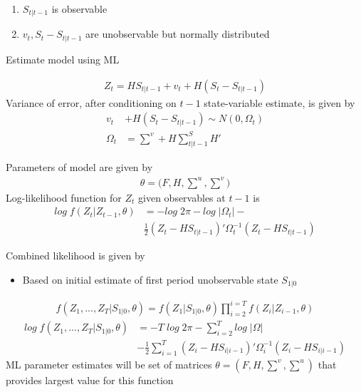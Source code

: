 \documentclass{beamer}
\begin{document}
\begin{frame}
  \begin{enumerate}
     \item $S_{t|t-1}$ is observable
     \item $v_t, S_t-S_{t|t-1}$ are unobservable but normally distributed
   \end{enumerate} 
   \medskip
   Estimate model using ML
  
  \begin{align}
    Z_t=HS_{t|t-1}+v_t +H(S_t-S_{t|t-1})
  \end{align}
  \medskip
  Variance of error, after conditioning on $t-1$ state-variable estimate, is given by
  \begin{align}
    v_t &+ H(S_t-S_{t|t-1}) \sim N (0,\Omega_t)\\
    \Omega_t &=\scriptstyle\sum^v \textstyle+ H \scriptstyle \sum^S_{t|t-1} \textstyle H'
  \end{align}  
\end{frame}

\begin{frame}
  Parameters of model are given by 
  \begin{align}
    \theta=(F,H,\scriptstyle \sum^u,\sum^v \textstyle)
  \end{align}
  Log-likelihood function for $Z_t$ given observables at $t-1$ is  
  \begin{align}
    log\;f(Z_t|Z_{t-1},\theta)&= -log\; 2\pi -log\;|\Omega_t|- \\ \nonumber &\frac{1}{2}(Z_t-HS_{t|t-1})' \Omega_t^{-1}(Z_t-HS_{t|t-1})
  \end{align}  
\end{frame}


\begin{frame}
  Combined likelihood is given by
  \begin{itemize}
    \item Based on initial estimate of first period unobservable state $S_{1|0}$
  \end{itemize}
  \begin{align}
    f(Z_1,...,Z_T|S_{1|0},\theta)=f(Z_1|S_{1|0},\theta)\prod_{i=2}^{i=T}f(Z_i|Z_{i-1},\theta)
  \end{align}
  \begin{align}
    log\;f(Z_1,...,Z_T|S_{1|0}, \theta) &= -T\;log\; 2\pi - \sum^T_{i=2}log\; |\Omega| \\ \nonumber
    &- \frac{1}{2} \sum^T_{i=1} (Z_i-HS_{i|i-1})' \Omega_i^{-1} (Z_i - HS_{i|i-1}) 
  \end{align}
  ML parameter estimates will be set of matrices $\theta=(F,H,\sum^v,\sum^u)$ that provides largest value for this function  
\end{frame}
\end{document}
